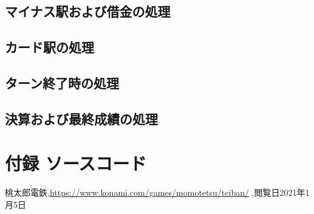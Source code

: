 \documentclass[a4j]{jarticle}
\begin{document}
    \subsection{マイナス駅および借金の処理}
    \subsection{カード駅の処理}
    \subsection{ターン終了時の処理}
    \subsection{決算および最終成績の処理}
    
    \section{付録 ソースコード}

    \begin{thebibliography}{9}
          桃太郎電鉄,\url{https://www.konami.com/games/momotetsu/teiban/} ,閲覧日2021年1月5日
        \end{thebibliography}
\end{document}
